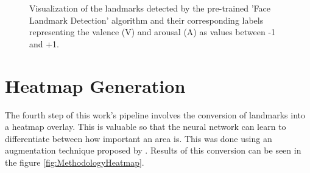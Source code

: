 \begin{figure}[H]
  \hfill
  \hfill
  \caption{Visualization of the landmarks detected by the pre-trained 'Face Landmark Detection' algorithm \citep{Kazemi:2014:ShapePredictor} and their corresponding labels representing the valence (V) and arousal (A) as values between -1 and +1.}
  \label{fig:MethodologyLandmarks}
\end{figure}


\section{Heatmap Generation}
The fourth step of this work's pipeline involves the conversion of landmarks into a heatmap overlay. This is valuable so that the neural network can learn to differentiate between how important an area is. This was done using an augmentation technique proposed by \citet[~para. 1]{Jung:2020:Imgaug}. Results of this conversion can be seen in the figure \ref{fig:MethodologyHeatmap}.

